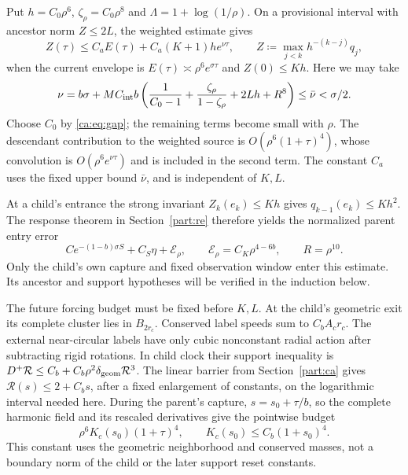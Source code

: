 \documentclass[11pt]{amsart}
\theoremstyle{remark}
\numberwithin{equation}{section}
\begin{document}
Put $h=C_0\rho^6$, $\zeta_\rho=C_0\rho^8$ and
$\Lambda=1+\log(1/\rho)$.
On a provisional interval with ancestor norm $Z\le2L$,
the weighted estimate gives
\begin{equation}\label{fi:causal}
 Z(\tau)\le C_aE(\tau)+C_a(K+1)h e^{\nu\tau},
 \qquad Z\coloneqq\max_{j<k}h^{-(k-j)}q_j ,
\end{equation}
when the current envelope is $E(\tau)\asymp\rho^6e^{\sigma\tau}$
and $Z(0)\le Kh$.
Here we may take
\[
 \nu=b\sigma+MC_{\rm int}b
 \left(\frac1{C_0-1}+\frac{\zeta_\rho}{1-\zeta_\rho}
                         +2Lh+R^8\right)\le\bar\nu<\sigma/2 .
\]
Choose $C_0$ by \eqref{ca:eq:gap}; the remaining terms become
small with $\rho$.
The descendant contribution to the weighted source is
$O(\rho^6(1+\tau)^4)$, whose convolution is
$O(\rho^6e^{\nu\tau})$ and is included in the second term.
The constant $C_a$ uses the fixed upper bound $\bar\nu$,
and is independent of $K,L$.

At a child's entrance the strong invariant $Z_k(e_k)\le Kh$
gives $q_{k-1}(e_k)\le Kh^2$.
The response theorem in Section~\ref{part:re} therefore yields
the normalized parent entry error
\begin{equation}\label{fi:entryerr}
 C e^{-(1-b)\sigma S}+C_S\eta+\mathcal E_\rho,
 \qquad \mathcal E_\rho=C_K\rho^{4-6b},
 \qquad R=\rho^{10}.
\end{equation}
Only the child's own capture and fixed observation window enter
this estimate. Its ancestor and support hypotheses will be verified
in the induction below.

The future forcing budget must be fixed before $K,L$.
At the child's geometric exit its complete cluster lies in $B_{2r_c}$.
Conserved label speeds sum to $C_bA_cr_c$.
The external near-circular labels have only cubic nonconstant radial
action after subtracting rigid rotations. In child clock their
support inequality is
$D^+\mathcal R\le C_b+C_b\rho^2\delta_{\rm geom}\mathcal R^3$.
The linear barrier from Section~\ref{part:ca} gives
$\mathcal R(s)\le2+C_bs$, after a fixed enlargement of constants,
on the logarithmic interval needed here.
During the parent's capture, $s=s_0+\tau/b$, so the complete
harmonic field and its rescaled derivatives give the pointwise budget
\begin{equation}\label{fi:pointwise-budget}
 \rho^6K_c(s_0)(1+\tau)^4,\qquad
 K_c(s_0)\le C_b(1+s_0)^4 .
\end{equation}
This constant uses the geometric neighborhood and conserved masses,
not a boundary norm of the child or the later support reset constants.
\end{document}
